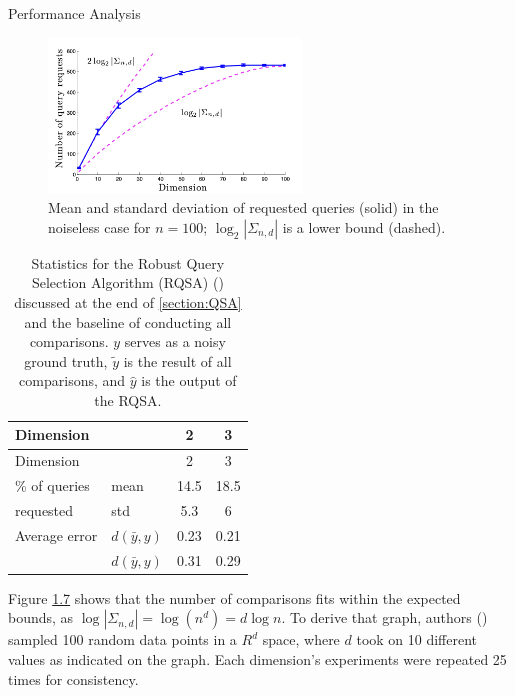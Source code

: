 \documentclass[
  letterpaper,
  DIV=11,
  numbers=noendperiod,
  oneside]{scrreprt}
\makeatletter
\let\oldparagraph\paragraph
\renewcommand{\paragraph}{
    \@ifstar
      \xxxParagraphStar
      \xxxParagraphNoStar
  }
\newcommand{\xxxParagraphStar}[1]{\oldparagraph*{#1}\mbox{}}
\newcommand{\xxxParagraphNoStar}[1]{\oldparagraph{#1}\mbox{}}
\theoremstyle{remark}
\makeatother
\begin{document}
\paragraph{Performance Analysis}\label{performance-analysis}

\begin{figure}

{\centering \includegraphics[width=0.6\textwidth,height=\textheight]{src/Figures/Dim:query_graph.png}

}

\caption{Mean and standard deviation of requested queries (solid) in the
noiseless case for \(n = 100\); \(\log_2|\Sigma_{n,d}|\) is a lower
bound (dashed).}

\end{figure}%

\label{fig:geo_acc}
\begin{longtable}[]{@{}llcc@{}}
\caption{Statistics for the Robust Query Selection Algorithm (RQSA)
() discussed at the end of
\hyperref[section:QSA]{{[}section:QSA{]}} and the baseline of conducting
all comparisons. \(y\) serves as a noisy ground truth, \(\tilde{y}\) is
the result of all comparisons, and \(\hat{y}\) is the output of the
RQSA.}\tabularnewline
\toprule\noalign{}
Dimension & & 2 & 3 \\
\midrule\noalign{}
\endfirsthead
\toprule\noalign{}
Dimension & & 2 & 3 \\
\midrule\noalign{}
\endhead
\bottomrule\noalign{}
\endlastfoot
\% of queries & mean & 14.5 & 18.5 \\
requested & std & 5.3 & 6 \\
Average error & \(d(\bar{y}, y)\) & 0.23 & 0.21 \\
& \(d(\bar{y}, y)\) & 0.31 & 0.29 \\
\end{longtable}

Figure \hyperref[fig:rand_n]{1.7} shows that the number of comparisons
fits within the expected bounds, as
\(\log|\Sigma_{n,d}| = \log(n^d) = d\log n\). To derive that graph,
authors () sampled 100 random
data points in a \(R^d\) space, where \(d\) took on 10 different values
as indicated on the graph. Each dimension's experiments were repeated 25
times for consistency.
\end{document}
